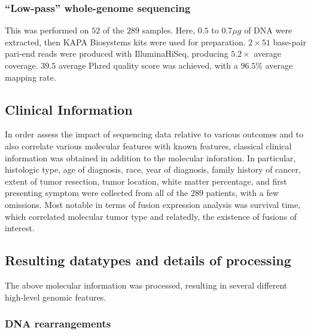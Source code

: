 \subsubsection{``Low-pass'' whole-genome sequencing}

This was performed on $52$ of the $289$ samples. Here, $0.5$ to $0.7\mu g$ of DNA were extracted, then KAPA Biosystems\reg
kits were used for preparation. $2 \times 51$ base-pair pari-end reads
were produced with Illumina\reg HiSeq\tm, producing $5.2 \times$
average coverage. $39.5$ average Phred quality score was achieved,
with a $96.5\%$ average mapping rate.

\subsection{Clinical Information} 

In order assess the impact of sequencing data relative to various
outcomes and to also correlate various molecular features with known
features, classical clinical information was obtained in addition to
the molecular inforation. In particular, histologic type, age of
diagnosis, race, year of diagnosis, family history of cancer, extent
of tumor resection, tumor location, white matter percentage, and first
presenting symptom were collected from all of the $289$ patients, with
a few omissions. Most notable in terms of fusion expression analysis
was survival time, which correlated molecular tumor type and
relatedly, the existence of fusions of interest.

\subsection{Resulting datatypes and details of processing}

The above molecular information was processed, resulting in several
different high-level genomic features.

\subsubsection{DNA rearrangements}

